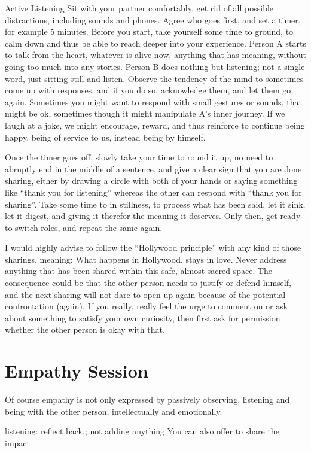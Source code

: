 \begin{exercise}{Active Listening}
    Sit with your partner comfortably, get rid of all possible distractions, including sounds and phones.
    Agree who goes first, and set a timer, for example 5 minutes.
    Before you start, take yourself some time to ground, to calm down and thus be able to reach deeper into your experience.
    Person A starts to talk from the heart, whatever is alive now, anything that has meaning, without going too much into any stories.
    Person B does nothing but listening; not a single word, just sitting still and listen.
    Observe the tendency of the mind to sometimes come up with responses, and if you do so, acknowledge them, and let them go again.
    Sometimes you might want to respond with small gestures or sounds, that might be ok, sometimes though it might manipulate A's inner journey.
    If we laugh at a joke, we might encourage, reward, and thus reinforce to continue being happy, being of service to us, instead being by himself.

    Once the timer goes off, slowly take your time to round it up, no need to abruptly end in the middle of a sentence, and give a clear sign that you are done sharing, either by drawing a circle with both of your hands or saying something like ``thank you for listening'' whereas the other can respond with ``thank you for sharing''.
    Take some time to in stillness, to process what has been said, let it sink, let it digest, and giving it therefor the meaning it deserves.
    Only then, get ready to switch roles, and repeat the same again.
\end{exercise}

I would highly advise to follow the ``Hollywood principle'' with any kind of those sharings, meaning: What happens in Hollywood, stays in love.
Never address anything that has been shared within this safe, almost sacred space.
The consequence could be that the other person needs to justify or defend himself, and the next sharing will not dare to open up again because of the potential confrontation (again).
If you really, really feel the urge to comment on or ask about something to satisfy your own curiosity, then first ask for permission whether the other person is okay with that.


\section{Empathy Session}\label{sec:empathy-session}

Of course empathy is not only expressed by passively observing, listening and being with the other person, intellectually and emotionally.


listening: reflect back.; not adding anything
You can also offer to share the impact

